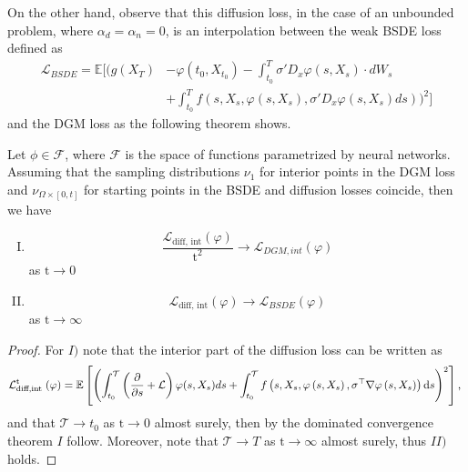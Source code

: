 On the other hand, observe that this diffusion loss, in the case of an unbounded problem, where $\alpha_d=\alpha_n=0$, is an interpolation between the weak BSDE loss defined as
\begin{equation}
	\begin{aligned}
			\mathcal{L}_{BSDE}=\mathbb{E}\Big[\Big(g(X_T)&-\varphi(t_0,X_{t_0})-\int_{t_0}^{T}\sigma'D_x \varphi (s,X_s)\cdot dW_s\\ &+\int_{t_0}^{T}f(s,X_s,\varphi(s,X_s),\sigma'D_x \varphi(s,X_s)ds)\Big)^2\Big]
	\end{aligned}
\end{equation}
and the DGM loss as the following theorem shows.
\begin{theorem}
	Let $\phi\in \mathcal{F}$, where $\mathcal{F}$ is the space of functions parametrized by neural networks. Assuming that the sampling distributions $\nu_1$ for interior points in the DGM loss and $\nu_{\Omega\times [0,t]}$ for starting points in the BSDE and diffusion losses coincide, then we have 
	\begin{enumerate}[I.]
		\item \begin{equation}
			\frac{\mathcal{L}_{\text{diff, int}}(\varphi)}{\mathrm{t}^2}\to \mathcal{L}_{DGM,int}(\varphi)
		\end{equation} as $\mathrm{t}\to 0$
		\item \begin{equation}
			\mathcal{L}_{\text{diff, int}}(\varphi)\to \mathcal{L}_{BSDE}(\varphi)
		\end{equation} as $\mathrm{t}\to \infty$
	\end{enumerate} 
\end{theorem}
\begin{proof}
	For $I)$ note that the interior part of the diffusion loss can be written as 
	\begin{equation}
		\mathcal{L}_{\text {diff,int }}^{\mathrm{t}}(\varphi)=\mathbb{E}\left[\left(\int_{t_0}^{\mathcal{T}}\left(\frac{\partial }{\partial s}+\mathcal{L}\right)\varphi(s,X_s)ds
		+\int_{t_0}^{\mathcal{T}} f\left(s,X_s, \varphi\left(s,X_s\right), \sigma^{\top} \nabla \varphi\left(s,X_s\right)\right) \mathrm{d} s\right)^2\right] \text {, }
	\end{equation} and that $\mathcal{T}\to t_0$ as $\mathrm{t}\to 0$ almost surely, then by the dominated convergence theorem $I$ follow. Moreover, note that $\mathcal{T}\to T$ as $\mathrm{t}\to\infty$ almost surely, thus $II)$  holds.
\end{proof}


